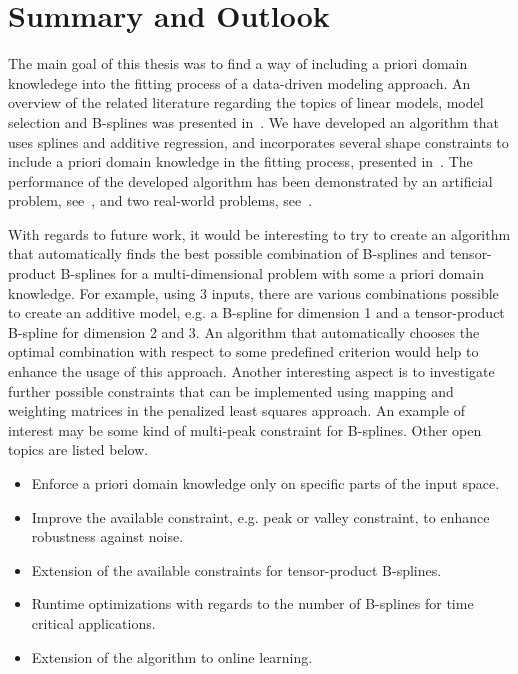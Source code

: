 \chapter{Summary and Outlook} \label{cha:summary}

The main goal of this thesis was to find a way of including a priori domain knowledege into the fitting process of a data-driven modeling approach. An overview of the related literature regarding the topics of linear models, model selection and B-splines was presented in~. We have developed an algorithm that uses splines and additive regression, and incorporates several shape constraints to include a priori domain knowledge in the fitting process, presented in~. The performance of the developed algorithm has been demonstrated by an artificial problem, see~, and two real-world problems, see~.

With regards to future work, it would be interesting to try to create an algorithm that automatically finds the best possible combination of B-splines and tensor-product B-splines for a multi-dimensional problem with some a priori domain knowledge. For example, using 3 inputs, there are various combinations possible to create an additive model, e.g. a B-spline for dimension 1 and a tensor-product B-spline for dimension 2 and 3. An algorithm that automatically chooses the optimal combination with respect to some predefined criterion would help to enhance the usage of this approach. Another interesting aspect is to investigate further possible constraints that can be implemented using mapping and weighting matrices in the penalized least squares approach. An example of interest may be some kind of multi-peak constraint for B-splines. Other open topics are listed below.

\begin{itemize}
	\item Enforce a priori domain knowledge only on specific parts of the input space.
	\item Improve the available constraint, e.g. peak or valley constraint, to enhance robustness against noise.
	\item Extension of the available constraints for tensor-product B-splines.
	\item Runtime optimizations with regards to the number of B-splines for time critical applications.
	\item Extension of the algorithm to online learning. 
\end{itemize}